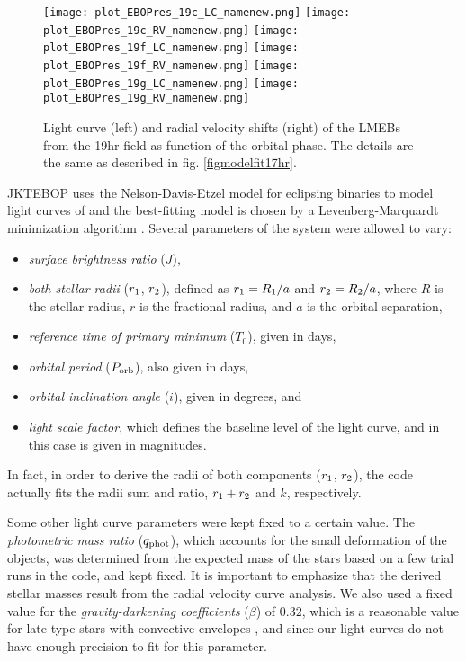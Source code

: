 \documentclass[fleqn,usenatbib]{mnras}
\begin{document}
\begin{figure*}
\begin{center}
\texttt{[image: plot\_EBOPres\_19c\_LC\_namenew.png]}
\texttt{[image: plot\_EBOPres\_19c\_RV\_namenew.png]}
\texttt{[image: plot\_EBOPres\_19f\_LC\_namenew.png]}
\texttt{[image: plot\_EBOPres\_19f\_RV\_namenew.png]}
\texttt{[image: plot\_EBOPres\_19g\_LC\_namenew.png]}
\texttt{[image: plot\_EBOPres\_19g\_RV\_namenew.png]}
\caption{Light curve (left) and radial velocity shifts (right) of the LMEBs from the 19hr field as function of the orbital phase. The details are the same as described in fig. \ref{figmodelfit17hr}.}
\label{figmodelfit19hr}
\end{center}
\end{figure*}



JKTEBOP uses the Nelson-Davis-Etzel model for eclipsing binaries \citep[NDE model,][]{Nelson72,Popper81} to model light curves of and the best-fitting model is chosen by a Levenberg-Marquardt minimization algorithm \citep[MRQMIN,][]{Press92}. 
Several parameters of the system were allowed to vary:
\begin{itemize}
\renewcommand\labelitemi{--}
\item {\em surface brightness ratio} ($J$),
\item {\em both stellar radii} ($r_{\rm 1}$, $r_{\rm 2}$), defined as $r_{\rm 1} = R_{\rm 1} / a$ and $r_{\rm 2} = R_{\rm 2} / a$, where $R$ is the stellar radius, $r$ is the fractional radius, and $a$ is the orbital separation,
\item {\em reference time of primary minimum} ($T_0$), given in days,
\item {\em orbital period} ($P_{\rm orb}$), also given in days,
\item {\em orbital inclination angle} ($i$), given in degrees, and
\item {\em light scale factor}, which defines the baseline level of the light curve, and in this case is given in magnitudes.
\end{itemize}
In fact, in order to derive the radii of both components ($r_{\rm 1}$, $r_{\rm 2}$), the code actually fits the radii sum and ratio, $r_{\rm 1}+r_{\rm 2}$ and $k$, respectively.

Some other light curve parameters were kept fixed to a certain value. The {\em photometric mass ratio} ($q_{\rm phot}$), which accounts for the small deformation of the objects, was determined from the expected mass of the stars based on a few trial runs in the code, and kept fixed. It is important to emphasize that the derived stellar masses result from the radial velocity curve analysis.  
We also used a fixed value for the {\em gravity-darkening coefficients} ($\beta$) of $0.32$, which is a reasonable value for late-type stars with convective envelopes \citep{Lucy67}, and since our light curves do not have enough precision to fit for this parameter.
\end{document}
